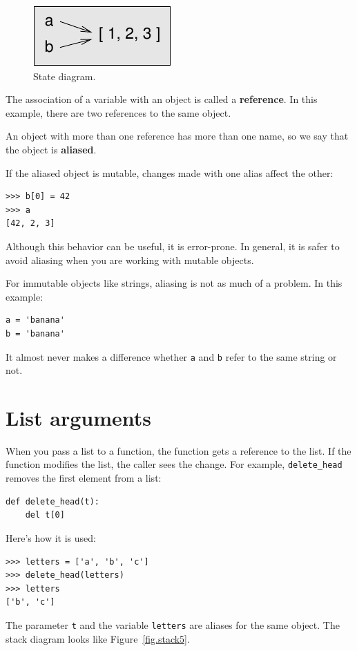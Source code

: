 \documentclass[10pt]{book}
\begin{document}
\begin{figure}
\centerline
{\includegraphics[scale=0.8]{figs/list3.pdf}}
\caption{State diagram.}
\label{fig.list3}
\end{figure}

The association of a variable with an object is called a {\bf
reference}.  In this example, there are two references to the same
object.

An object with more than one reference has more
than one name, so we say that the object is {\bf aliased}.

If the aliased object is mutable, changes made with one alias affect
the other:

\begin{verbatim}
>>> b[0] = 42
>>> a
[42, 2, 3]
\end{verbatim}
%
Although this behavior can be useful, it is error-prone.  In general,
it is safer to avoid aliasing when you are working with mutable
objects.

For immutable objects like strings, aliasing is not as much of a
problem.  In this example:

\begin{verbatim}
a = 'banana'
b = 'banana'
\end{verbatim}
%
It almost never makes a difference whether {\tt a} and {\tt b} refer
to the same string or not.


\section{List arguments}
\label{list.arguments}

When you pass a list to a function, the function gets a reference to
the list.  If the function modifies the list, the caller sees
the change.  For example, \verb"delete_head" removes the first element
from a list:

\begin{verbatim}
def delete_head(t):
    del t[0]
\end{verbatim}
%
Here's how it is used:

\begin{verbatim}
>>> letters = ['a', 'b', 'c']
>>> delete_head(letters)
>>> letters
['b', 'c']
\end{verbatim}
%
The parameter {\tt t} and the variable {\tt letters} are
aliases for the same object.  The stack diagram looks like
Figure~\ref{fig.stack5}.
\end{document}
